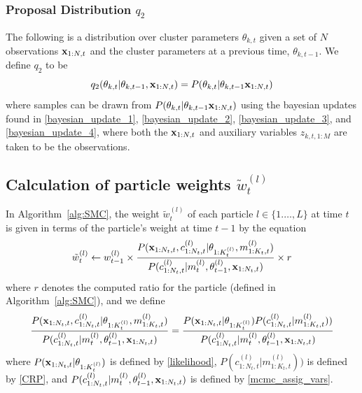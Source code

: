 \documentclass[smallcondensed, final]{svjour3}
\begin{document}
\subsubsection{Proposal Distribution $q_{2}$}
\label{sec:smc_proposal_3}

The following is a distribution over cluster parameters $\theta_{k,t}$ given a set of $N$ observations $\bold{x}_{1:N, t}$ and the cluster parameters at a previous time, $\theta_{k,t-1}$. We define $q_{2}$ to be
\begin{equation}
\label{smc_q2_eqn}
q_{2}(\theta_{k,t} | \theta_{k,t-1},\bold{x}_{1:N,t}) = P(\theta_{k,t} | \theta_{k,t-1} \bold{x}_{1:N,t})
\end{equation}
where samples can be drawn from $P(\theta_{k,t} | \theta_{k,t-1} \bold{x}_{1:N,t})$ using the bayesian updates found in \eqref{bayesian_update_1}, \eqref{bayesian_update_2}, \eqref{bayesian_update_3}, and \eqref{bayesian_update_4}, where both the $\bold{x}_{1:N,t}$ and auxiliary variables $z_{k,t,1:M}$ are taken to be the observations.




\subsection{Calculation of particle weights $\tilde{w}_{t}^{(l)}$}
In Algorithm~\ref{alg:SMC}, the weight $\tilde{w}_{t}^{(l)}$ of each particle $l \in \{ 1. \ldots, L \}$ at time $t$ is given in terms of the particle's weight at time $t-1$ by the equation
\begin{equation}
\tilde{w}_{t}^{(l)} \leftarrow w_{t-1}^{(l)} \times \frac{ P(\bold{x}_{1:N_{t},t}, c_{1:N_{t}, t}^{(l)} | \theta_{1:K_{t}^{(l)}}, m_{1:K_{t},t}^{(l)})}	{P(c_{1:N_{t}, t}^{(l)} | m_{t}^{(l)}, \theta_{t-1}^{(l)}, \bold{x}_{1:N_{t},t} ) } \times r
\end{equation}
where $r$ denotes the computed ratio for the particle (defined in Algorithm~\ref{alg:SMC}), and we define
\begin{equation}
\label{smc_weight_eqn}
\begin{split}
& \frac{ P(\bold{x}_{1:N_{t},t}, c_{1:N_{t}, t}^{(l)} | \theta_{1:K_{t}^{(l)}}, m_{1:K_{t},t}^{(l)})}	{P(c_{1:N_{t}, t}^{(l)} | m_{t}^{(l)}, \theta_{t-1}^{(l)}, \bold{x}_{1:N_{t},t} ) }  = 
\frac{P(\bold{x}_{1:N_{t},t} | \theta_{1:K_{t}^{(l)}}) P(c_{1:N_{t}, t}^{(l)} | m_{1:K_{t},t}^{(l)}) )}{P(c_{1:N_{t}, t}^{(l)} | m_{t}^{(l)}, \theta_{t-1}^{(l)}, \bold{x}_{1:N_{t},t})}
\\
%
%
\end{split}
\end{equation}
where $P(\bold{x}_{1:N_{t},t} | \theta_{1:K_{t}^{(l)}})$ is defined by \eqref{likelihood}, $P(c_{1:N_{t}, t}^{(l)} | m_{1:K_{t},t}^{(l)}))$ is defined by \eqref{CRP}, and $P(c_{1:N_{t}, t}^{(l)} | m_{t}^{(l)}, \theta_{t-1}^{(l)}, \bold{x}_{1:N_{t},t})$ is defined by \eqref{mcmc_assig_vars}.
\end{document}
